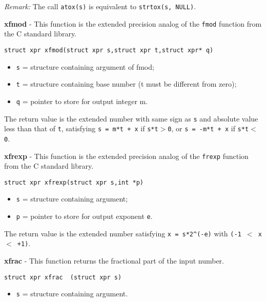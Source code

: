 \documentclass{article}
\begin{document}
\textit{Remark:}
The call  \texttt{atox(s)}  is equivalent to \texttt{strtox(s, NULL)}.


\hrulefill{}

\textbf{xfmod} - This function is the extended precision analog of the 
\texttt{fmod} function from the C standard library.

\begin{verbatim}
struct xpr xfmod(struct xpr s,struct xpr t,struct xpr* q)
\end{verbatim}

\begin{itemize}
\item \texttt{s} = structure containing argument of fmod;
\item \texttt{t} = structure containing base number (t must be different from zero);
\item \texttt{q} = pointer to store for output integer m.
\end{itemize}

The return value is the extended number with same sign as \texttt{s}
and absolute value less than that of \texttt{t}, satisfying
\texttt{s =  m*t + x}  if \texttt{s*t$>$0}, or
\texttt{s = -m*t + x}  if \texttt{s*t$<$0}.


\hrulefill{}

\textbf{xfrexp} - This function is the extended precision analog of the
\texttt{frexp} function from the C standard library.

\begin{verbatim}
struct xpr xfrexp(struct xpr s,int *p)
\end{verbatim}

\begin{itemize}
\item \texttt{s} = structure containing argument;
\item \texttt{p} = pointer to store for output exponent \texttt{e}.
\end{itemize}

The return value is the extended number satisfying
\texttt{x = s*2\^{}(-e)}  with  \texttt{(-1 $<$ x $<$ +1)}.


\hrulefill{}

\textbf{xfrac} - This function returns the fractional part of the
input number.

\begin{verbatim}
struct xpr xfrac  (struct xpr s)
\end{verbatim}

\begin{itemize}
\item \texttt{s} = structure containing argument.
\end{itemize}
\end{document}
